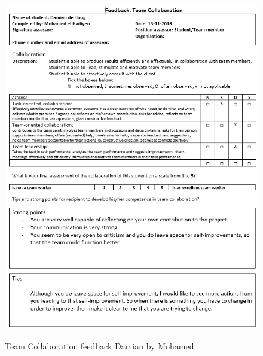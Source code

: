 \documentclass[12pt]{article}
\begin{document}
	\begin{figure}[p!]
		\centering
		\includegraphics[width=\columnwidth]{CoopDamian1.PNG}\\
		\caption{Team Collaboration feedback Damian by Mohamed}
	\end{figure}
\end{document}

